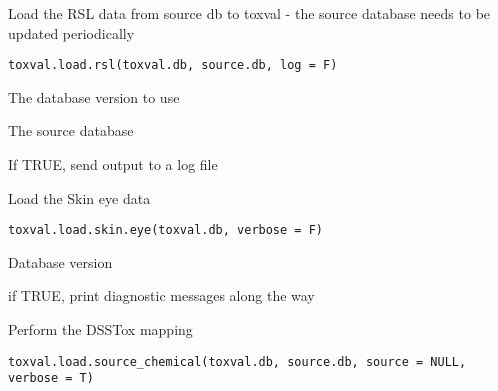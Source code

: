 \documentclass[letterpaper]{book}
\begin{document}
%
\begin{Description}\relax
Load the RSL data from source db to toxval - the source database needs to be updated periodically
\end{Description}
%
\begin{Usage}
\begin{verbatim}
toxval.load.rsl(toxval.db, source.db, log = F)
\end{verbatim}
\end{Usage}
%
\begin{Arguments}
\begin{ldescription}
\item[\code{toxval.db}] The database version to use

\item[\code{source.db}] The source database

\item[\code{log}] If TRUE, send output to a log file
\end{ldescription}
\end{Arguments}
%
\begin{Description}\relax
Load the Skin eye data
\end{Description}
%
\begin{Usage}
\begin{verbatim}
toxval.load.skin.eye(toxval.db, verbose = F)
\end{verbatim}
\end{Usage}
%
\begin{Arguments}
\begin{ldescription}
\item[\code{toxval.db}] Database version

\item[\code{verbose}] if TRUE, print diagnostic messages along the way
\end{ldescription}
\end{Arguments}
%
\begin{Description}\relax
Perform the DSSTox mapping
\end{Description}
%
\begin{Usage}
\begin{verbatim}
toxval.load.source_chemical(toxval.db, source.db, source = NULL, verbose = T)
\end{verbatim}
\end{Usage}
\end{document}
